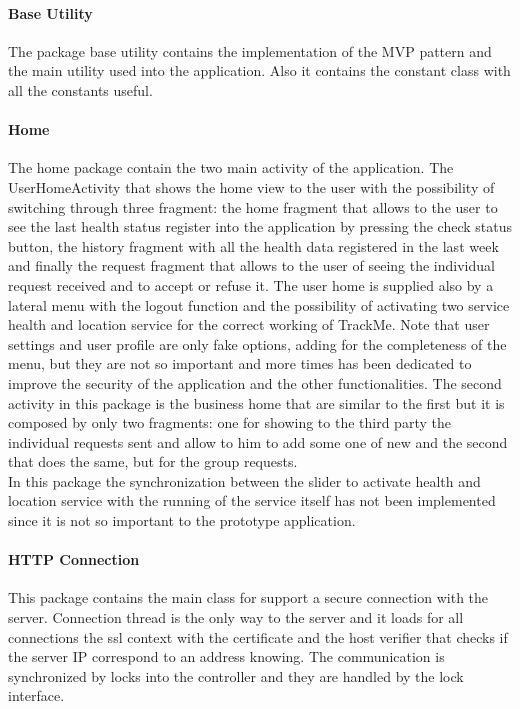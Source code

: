 \paragraph{Base Utility}
The package base utility contains the implementation of the MVP pattern and the main utility used into the application. Also it contains the constant class with all the constants useful.

\paragraph{Home}
The home package contain the two main activity of the application. The UserHomeActivity that shows the home view to the user with the possibility of switching through three fragment: the home fragment that allows to the user to see the last health status register into the application by pressing the check status button, the history fragment with all the health data registered in the last week and finally the request fragment that allows to the user of seeing the individual request received and to accept or refuse it. The user home is supplied also by a lateral menu with the logout function and the possibility of activating two service health and location service for the correct working of TrackMe. Note that user settings and user profile are only fake options, adding for the completeness of the menu, but they are not so important and more times has been dedicated to improve the security of the application and the other functionalities. The second activity in this package is the business home that are similar to the first but it is composed by only two fragments: one for showing to the third party the individual requests sent and allow to him to add some one of new and the second that does the same, but for the group requests.\\
In this package the synchronization between the slider to activate health and location service with the running of the service itself has not been implemented since it is not so important to the prototype application.

\paragraph{HTTP Connection}
This package contains the main class for support a secure connection with the server. Connection thread is the only way to the server and it loads for all connections the ssl context with the certificate and the  host verifier that checks if the server IP correspond to an address knowing. The communication is synchronized by locks into the controller and they are handled by the lock interface. 

